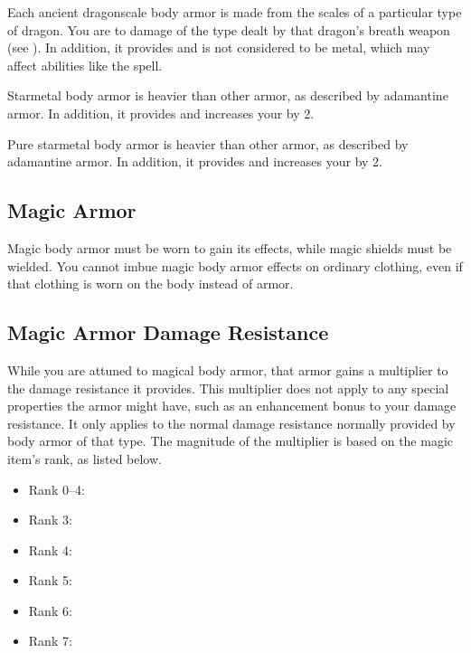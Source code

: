          Each ancient dragonscale body armor is made from the scales of a particular type of dragon.
        You are  to damage of the type dealt by that dragon's breath weapon (see ).
        In addition, it provides   and is not considered to be metal, which may affect abilities like the  spell.

         Starmetal body armor is heavier than other armor, as described by adamantine armor.
        In addition, it provides   and increases your  by 2.

         Pure starmetal body armor is heavier than other armor, as described by adamantine armor.
        In addition, it provides   and increases your  by 2.

\begin{longcolumn}
\section{Magic Armor}
\begin{longtablepreface}
    Magic body armor must be worn to gain its effects, while magic shields must be wielded.
    You cannot imbue magic body armor effects on ordinary clothing, even if that clothing is worn on the body instead of armor.

    \subsection{Magic Armor Damage Resistance}\label{Magic Armor Damage Resistance}
        While you are attuned to magical body armor, that armor gains a multiplier to the damage resistance it provides.
        This multiplier does not apply to any special properties the armor might have, such as an enhancement bonus to your damage resistance.
        It only applies to the normal damage resistance normally provided by body armor of that type.
        The magnitude of the multiplier is based on the magic item's rank, as listed below.

        \begin{itemize}
            \item Rank 0--4: 
            \item Rank 3: 
            \item Rank 4: 
            \item Rank 5: 
            \item Rank 6: 
            \item Rank 7: 
        \end{itemize}
\end{longtablepreface}

    

\end{longcolumn}

